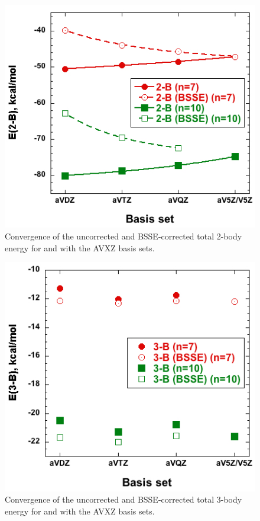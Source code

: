 \documentclass [11pt, proquest] {uwthesis}[2020/02/24]
\begin{document}
\begin{figure}[t]
\uwsinglespace
\begin{center}
\includegraphics[width=\textwidth]{Figures/Chapter_2/E_2B_7_10.jpg}
\end{center}
\label{fig:MBE_I_F6}
\caption[temp]{Convergence of the uncorrected and BSSE-corrected total 2-body energy for  and  with the AVXZ basis sets.}
\end{figure}

\begin{figure}[t]
\uwsinglespace
\begin{center}
\includegraphics[width=\textwidth]{Figures/Chapter_2/E_3B_7_10.jpg}
\end{center}
\label{fig:MBE_I_F7}
\caption[temp]{Convergence of the uncorrected and BSSE-corrected total 3-body energy for  and  with the AVXZ basis sets.}
\end{figure}
\end{document}
